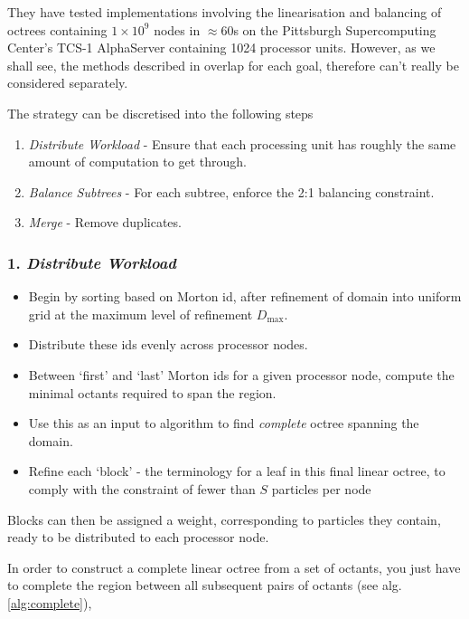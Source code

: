 \documentclass[12pt, a4, twoside]{article}
\begin{document}
They have tested implementations involving the linearisation and balancing of octrees containing $1 \times 10^9$ nodes in  $\approx 60$s on the Pittsburgh Supercomputing Center’s TCS-1 AlphaServer containing 1024 processor units. However, as we shall see, the methods described in \cite{Sundar:2008:SIAM} overlap for each goal, therefore can't really be considered separately.

The strategy can be discretised into the following steps

\begin{enumerate}
    \item \textit{Distribute Workload} - Ensure that each processing unit has roughly the same amount of computation to get through.
    \item \textit{Balance Subtrees} - For each subtree, enforce the 2:1 balancing constraint.
    \item \textit{Merge} - Remove duplicates.
\end{enumerate}

\subsubsection*{1. \textit{Distribute Workload}}

\begin{itemize}
    \item Begin by sorting based on Morton id, after refinement of domain into uniform grid at the maximum level of refinement $D_{\max}$.
    \item Distribute these ids evenly across processor nodes.
    \item Between `first' and `last' Morton ids for a given processor node, compute the minimal octants required to span the region.
    \item Use this as an input to algorithm to find \textit{complete} octree spanning the domain.
    \item Refine each `block' - the terminology for a leaf in this final linear octree, to comply with the constraint of fewer than $S$ particles per node
\end{itemize}

Blocks can then be assigned a weight, corresponding to particles they contain, ready to be distributed to each processor node.


In order to construct a complete linear octree from a set of octants, you just have to complete the region between all subsequent pairs of octants (see alg. \ref{alg:complete}),
\end{document}
